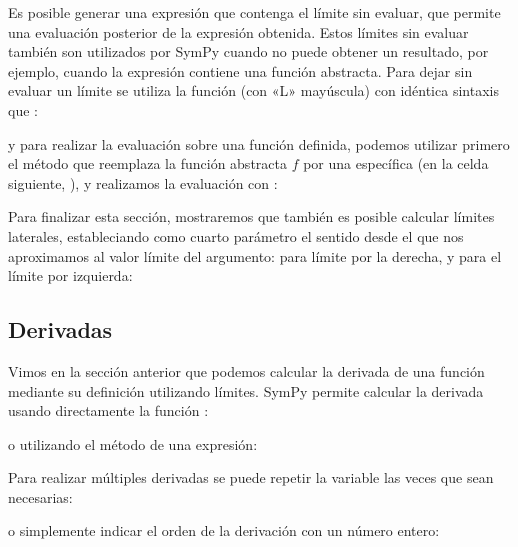 
Es posible generar una expresión que contenga el límite sin evaluar, que permite una evaluación posterior de la expresión obtenida. Estos límites sin evaluar también son utilizados por SymPy cuando no puede obtener un resultado, por ejemplo, cuando la expresión contiene una función abstracta. Para dejar sin evaluar un límite se utiliza la función  (con «L» mayúscula) con idéntica sintaxis que :


\noindent y para realizar la evaluación sobre una función definida, podemos utilizar primero el método  que reemplaza la función abstracta $f$ por una específica (en la celda siguiente, ), y realizamos la evaluación con :


Para finalizar esta sección, mostraremos que también es posible calcular límites laterales, estableciando como cuarto parámetro el sentido desde el que nos aproximamos al valor límite del argumento:  para límite por la derecha, y  para el límite por izquierda:


\subsection{Derivadas}

Vimos en la sección anterior que podemos calcular la derivada de una función mediante su definición utilizando límites. SymPy permite calcular la derivada usando directamente la función :


\noindent o utilizando el método  de una expresión:


Para realizar múltiples derivadas se puede repetir la variable las veces que sean necesarias:

\noindent o simplemente indicar el orden de la derivación con un número entero:

